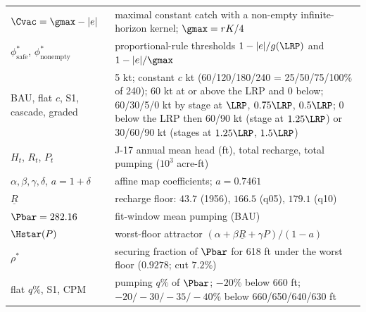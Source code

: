 \begin{longtable}{p{}p{}}
$\Cvac=\gmax-|e|$ & maximal constant catch with a non-empty infinite-horizon kernel; $\gmax=rK/4$ \\
$\phi^*_{\mathrm{safe}}$, $\phi^*_{\mathrm{nonempty}}$ & proportional-rule thresholds $1-|e|/g(\LRP)$ and $1-|e|/\gmax$ \\
BAU, flat $c$, S1, cascade, graded & 5 kt; constant $c$ kt (60/120/180/240 = 25/50/75/100\% of 240); 60 kt at or above the LRP and 0 below; 60/30/5/0 kt by stage at $\LRP$, $0.75\LRP$, $0.5\LRP$; 0 below the LRP then 60/90 kt (stage at $1.25\LRP$) or 30/60/90 kt (stages at $1.25\LRP$, $1.5\LRP$) \\
\midrule
$H_t$, $R_t$, $P_t$ & J-17 annual mean head (ft), total recharge, total pumping ($10^3$ acre-ft) \\
$\alpha,\beta,\gamma,\delta$, $a=1+\delta$ & affine map coefficients; $a=0.7461$ \\
$\underline R$ & recharge floor: $43.7$ (1956), $166.5$ (q05), $179.1$ (q10) \\
$\Pbar=282.16$ & fit-window mean pumping (BAU) \\
$\Hstar(P)$ & worst-floor attractor $(\alpha+\beta\underline R+\gamma P)/(1-a)$ \\
$\rho^*$ & securing fraction of $\Pbar$ for 618 ft under the worst floor ($0.9278$; cut $7.2\%$) \\
flat $q\%$, S1, CPM & pumping $q\%$ of $\Pbar$; $-20\%$ below 660 ft; $-20/-30/-35/-40\%$ below 660/650/640/630 ft \\
\bottomrule
\end{longtable}

